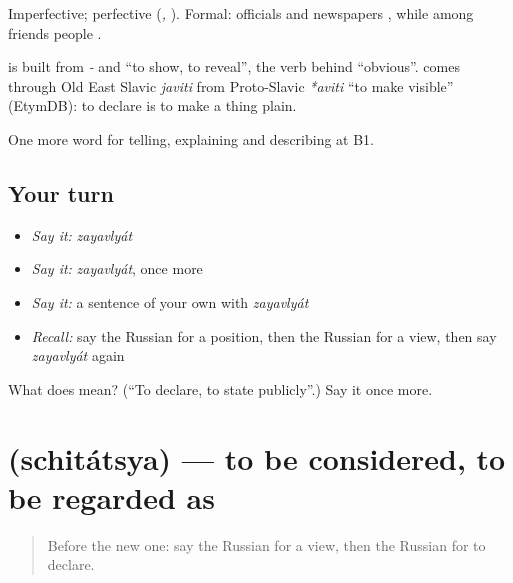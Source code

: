 Imperfective; perfective \emph{} (\emph{, }). Formal: officials and newspapers \emph{}, while among friends people \emph{}.

\begin{cousinweb}
\textbf{} is built from \emph{-} and \emph{} \textquotedblleft{}to show, to reveal\textquotedblright{}, the verb behind \emph{} \textquotedblleft{}obvious\textquotedblright{}. \emph{} comes through Old East Slavic \emph{javiti} from Proto-Slavic \emph{*aviti} \textquotedblleft{}to make visible\textquotedblright{} (EtymDB): to declare is to make a thing plain.
\end{cousinweb}

\begin{grammarlens}[title={What you've built}]
One more word for telling, explaining and describing at B1.
\end{grammarlens}

\subsection*{Your turn}
\begin{itemize}
\raggedright
  \item \emph{Say it:} \emph{zayavlyát}
  \item \emph{Say it:} \emph{zayavlyát}, once more
  \item \emph{Say it:} a sentence of your own with \emph{zayavlyát}
  \item \emph{Recall:} say the Russian for a position, then the Russian for a view, then say \emph{zayavlyát} again
\end{itemize}

\begin{tcolorbox}[breakable,colback=teal!4,colframe=teal!35!black,title={Before you move on}]
What does  mean? (\textquotedblleft{}To declare, to state publicly\textquotedblright{}.) Say it once more.
\end{tcolorbox}
\section[\texorpdfstring{\ru{считаться} (schitátsya)}{считаться (schitátsya)}]{ (schitátsya) — to be considered, to be regarded as}

\label{lesson:RU-C337-schitatsya}



\begin{quote}
Before the new one: say the Russian for a view, then the Russian for to declare.
\end{quote}

